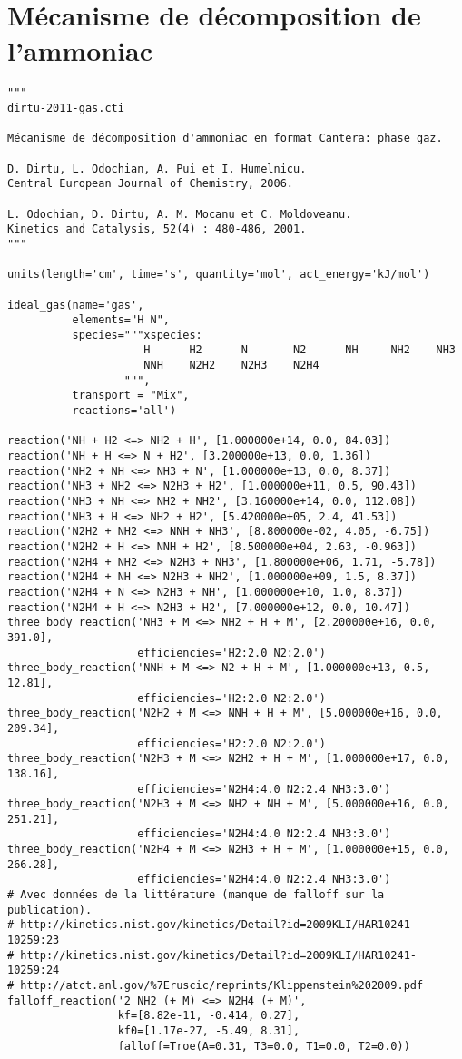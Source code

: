 \chapter{Mécanisme de décomposition de l'ammoniac}
\label{an:mécanisme-odochian}

\begin{verbatim}
"""
dirtu-2011-gas.cti

Mécanisme de décomposition d'ammoniac en format Cantera: phase gaz.

D. Dirtu, L. Odochian, A. Pui et I. Humelnicu. 
Central European Journal of Chemistry, 2006.

L. Odochian, D. Dirtu, A. M. Mocanu et C. Moldoveanu. 
Kinetics and Catalysis, 52(4) : 480-486, 2001.
"""

units(length='cm', time='s', quantity='mol', act_energy='kJ/mol')

ideal_gas(name='gas',
          elements="H N",
          species="""xspecies:
                     H      H2      N       N2      NH     NH2    NH3
                     NNH    N2H2    N2H3    N2H4
                  """,
          transport = "Mix",
          reactions='all')

reaction('NH + H2 <=> NH2 + H', [1.000000e+14, 0.0, 84.03])
reaction('NH + H <=> N + H2', [3.200000e+13, 0.0, 1.36])
reaction('NH2 + NH <=> NH3 + N', [1.000000e+13, 0.0, 8.37])
reaction('NH3 + NH2 <=> N2H3 + H2', [1.000000e+11, 0.5, 90.43])
reaction('NH3 + NH <=> NH2 + NH2', [3.160000e+14, 0.0, 112.08])
reaction('NH3 + H <=> NH2 + H2', [5.420000e+05, 2.4, 41.53])
reaction('N2H2 + NH2 <=> NNH + NH3', [8.800000e-02, 4.05, -6.75])
reaction('N2H2 + H <=> NNH + H2', [8.500000e+04, 2.63, -0.963])
reaction('N2H4 + NH2 <=> N2H3 + NH3', [1.800000e+06, 1.71, -5.78])
reaction('N2H4 + NH <=> N2H3 + NH2', [1.000000e+09, 1.5, 8.37])
reaction('N2H4 + N <=> N2H3 + NH', [1.000000e+10, 1.0, 8.37])
reaction('N2H4 + H <=> N2H3 + H2', [7.000000e+12, 0.0, 10.47])
three_body_reaction('NH3 + M <=> NH2 + H + M', [2.200000e+16, 0.0, 391.0],
                    efficiencies='H2:2.0 N2:2.0')
three_body_reaction('NNH + M <=> N2 + H + M', [1.000000e+13, 0.5, 12.81],
                    efficiencies='H2:2.0 N2:2.0')
three_body_reaction('N2H2 + M <=> NNH + H + M', [5.000000e+16, 0.0, 209.34],
                    efficiencies='H2:2.0 N2:2.0')
three_body_reaction('N2H3 + M <=> N2H2 + H + M', [1.000000e+17, 0.0, 138.16],
                    efficiencies='N2H4:4.0 N2:2.4 NH3:3.0')
three_body_reaction('N2H3 + M <=> NH2 + NH + M', [5.000000e+16, 0.0, 251.21],
                    efficiencies='N2H4:4.0 N2:2.4 NH3:3.0')
three_body_reaction('N2H4 + M <=> N2H3 + H + M', [1.000000e+15, 0.0, 266.28],
                    efficiencies='N2H4:4.0 N2:2.4 NH3:3.0')
# Avec données de la littérature (manque de falloff sur la publication).
# http://kinetics.nist.gov/kinetics/Detail?id=2009KLI/HAR10241-10259:23
# http://kinetics.nist.gov/kinetics/Detail?id=2009KLI/HAR10241-10259:24
# http://atct.anl.gov/%7Eruscic/reprints/Klippenstein%202009.pdf
falloff_reaction('2 NH2 (+ M) <=> N2H4 (+ M)',
                 kf=[8.82e-11, -0.414, 0.27],
                 kf0=[1.17e-27, -5.49, 8.31],
                 falloff=Troe(A=0.31, T3=0.0, T1=0.0, T2=0.0))
\end{verbatim}

